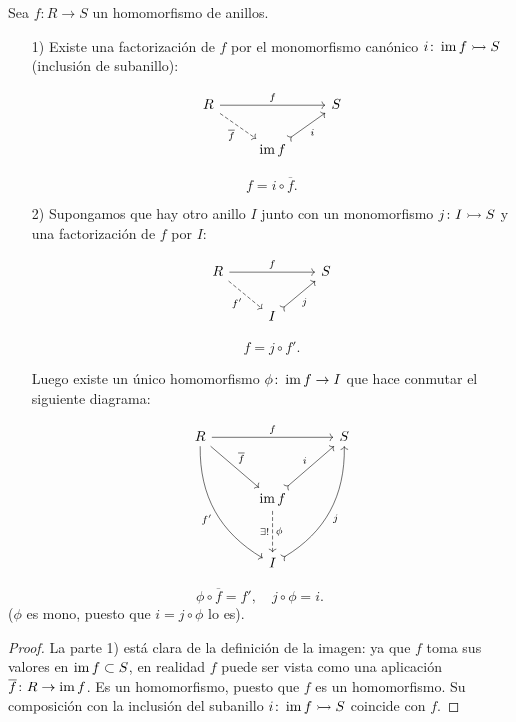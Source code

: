 \begin{proposicion}
  Sea $f\colon R\to S$ un homomorfismo de anillos.

  \begin{enumerate}
  \item[1)] Existe una factorización de $f$ por el monomorfismo canónico
    $i\colon \operatorname{im} f \rightarrowtail S$ (inclusión de subanillo):

    \[ \begin{tikzcd}
        R\ar{rr}{f}\ar[dashed]{dr}[swap]{\overline{f}} & & S\\
        & \im f\ar[>->]{ur}[swap]{i}
      \end{tikzcd} \]

    \[ f = i\circ \overline{f}. \]

  \item[2)] Supongamos que hay otro anillo $I$ junto con un monomorfismo
    $j\colon I \rightarrowtail S$ y una factorización de $f$ por $I$:

    \[ \begin{tikzcd}
        R\ar{rr}{f}\ar[dashed]{dr}[swap]{f'} & & S\\
        & I\ar[>->]{ur}[swap]{j}
      \end{tikzcd} \]

    \[ f = j\circ f'. \]

    Luego existe un único homomorfismo $\phi\colon \operatorname{im} f \to I$
    que hace conmutar el siguiente diagrama:

    \[ \begin{tikzcd}[row sep=3em, column sep=3em]
        R\ar{rr}{f}\ar{dr}{\overline{f}}\ar[bend right]{ddr}[swap]{f'} & & S\\
        & \im f\ar[>->]{ur}{i}\ar[dashed]{d}{\phi}[swap]{\exists!} \\
        & I\ar[>->,bend right]{uur}[swap]{j}
      \end{tikzcd} \]
  \end{enumerate}

  \[ \phi\circ \overline{f} = f', \quad j\circ \phi = i. \]
  ($\phi$ es mono, puesto que $i = j\circ \phi$ lo es).

  \begin{proof}
    La parte 1) está clara de la definición de la imagen: ya que $f$ toma sus
    valores en $\operatorname{im} f \subset S$, en realidad $f$ puede ser vista como una
    aplicación $\overline{f}\colon R\to \operatorname{im} f$. Es un homomorfismo, puesto que
    $f$ es un homomorfismo. Su composición con la inclusión del subanillo
    $i\colon \operatorname{im} f\rightarrowtail S$ coincide con $f$.


\end{proof}
\end{proposicion}

